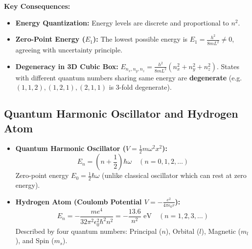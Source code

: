 \documentclass[12pt,a4paper]{article}
\begin{document}
\textbf{Key Consequences:}\par\noindent
\begin{itemize}[leftmargin=*, itemsep=2pt]
  \item \textbf{Energy Quantization:} Energy levels are discrete and proportional to $n^2$.
  \item \textbf{Zero-Point Energy ($E_1$):} The lowest possible energy is $E_1 = \frac{h^2}{8mL^2} \neq 0$, agreeing with uncertainty principle.
  \item \textbf{Degeneracy in 3D Cubic Box:} $E_{n_x,n_y,n_z} = \frac{h^2}{8mL^2}(n_x^2 + n_y^2 + n_z^2)$. States with different quantum numbers sharing same energy are \textbf{degenerate} (e.g. $(1,1,2), (1,2,1), (2,1,1)$ is 3-fold degenerate).
\end{itemize}

\subsection{Quantum Harmonic Oscillator and Hydrogen Atom}

\begin{tcolorbox}[formulabox, title={\textbf{Quantum Harmonic Oscillator and Hydrogen Atom Energies}}]
\begin{itemize}[leftmargin=*, itemsep=4pt]
  \item \textbf{Quantum Harmonic Oscillator ($V = \frac{1}{2}m\omega^2 x^2$):}
  \begin{equation}
  E_n = \left(n + \frac{1}{2}\right)\hbar \omega \quad (n = 0, 1, 2, \ldots)
  \end{equation}
  Zero-point energy $E_0 = \frac{1}{2}\hbar \omega$ (unlike classical oscillator which can rest at zero energy).
  \item \textbf{Hydrogen Atom (Coulomb Potential $V = -\frac{e^2}{4\pi\epsilon_0 r}$):}
  \begin{equation}
  E_n = -\frac{m e^4}{32 \pi^2 \epsilon_0^2 \hbar^2 n^2} = -\frac{13.6}{n^2} \text{ eV} \quad (n = 1, 2, 3, \ldots)
  \end{equation}
  Described by four quantum numbers: Principal ($n$), Orbital ($l$), Magnetic ($m_l$), and Spin ($m_s$).
\end{itemize}
\end{tcolorbox}
\end{document}
